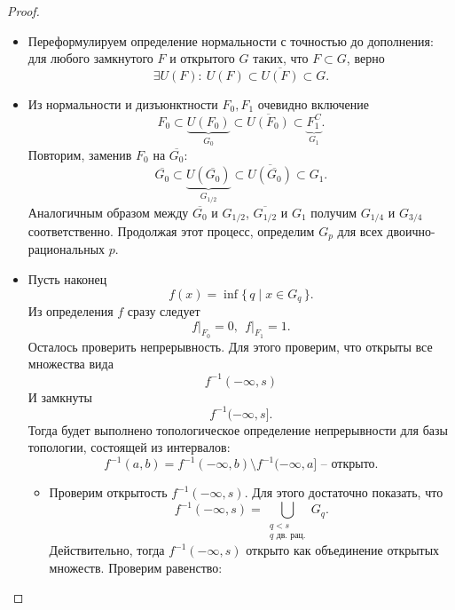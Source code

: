 \begin{proof}
    \enewline
    \begin{itemize}
        \item Переформулируем определение нормальности с точностью до дополнения:
            для любого замкнутого $F$ и открытого $G$ таких, что $F \subset G$,
            верно 
            \[
                \exists U(F) \colon~ U(F) \subset \overline{U(F)} \subset G
            .\]
        \item Из нормальности и дизъюнктности $F_0, F_1$ очевидно включение
            \[
                F_0 \subset \underbrace{U(F_0)}_{G_0} \subset \overline{U(F_0)}
                \subset \underbrace{F_1^C}_{G_1}
            .\]
            Повторим, заменив $F_0$ на $\overline{G_0}$:
            \[
                \overline{G_0} \subset \underbrace{U(\overline{G_0})}_{G_{1/2}}
                \subset \overline{U(\overline{G_0})} \subset G_1
            .\]
            Аналогичным образом между $\overline{G_0}$ и $G_{1/2}$,
            $\overline{G_{1/2}}$ и $G_1$ получим $G_{1/4}$ и $G_{3/4}$
            соответственно. Продолжая этот процесс, определим $G_p$ для
            всех двоично-рациональных $p$.
        \item Пусть наконец
            \[
                f(x) = \inf{\{\, q \mid x \in G_q \,\}}
            .\]
            Из определения $f$ сразу следует
            \[
                f\big|_{F_0} = 0,~~ f\big|_{F_1} = 1
            .\]
            Осталось проверить непрерывность. Для этого проверим, что открыты
            все множества вида
            \[
                f^{-1}(-\infty, s)
            \]
            И замкнуты
            \[
                f^{-1}(-\infty, s]
            .\]
            Тогда будет выполнено топологическое определение непрерывности для
            базы топологии, состоящей из интервалов:
            \[
                f^{-1}(a, b) = f^{-1}(-\infty, b) \setminus f^{-1}(-\infty, a]
                \text{ -- открыто}
            .\]
            \begin{itemize}
                \item Проверим открытость $f^{-1}(-\infty, s)$. Для этого
                    достаточно показать, что
                    \[
                        f^{-1}(-\infty, s) = \bigcup_{\substack{q < s \\ 
                        q \text{ дв. рац.}}}{G_q}
                    .\]
                    Действительно, тогда $f^{-1}(-\infty, s)$ открыто как
                    объединение открытых множеств. Проверим равенство:

\end{itemize}
\end{itemize}
\end{proof}
